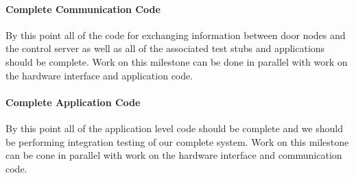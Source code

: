 \paragraph{Complete Communication Code}
By this point all of the code for exchanging information between door
nodes and the control server as well as all
of the associated test stubs and applications should be complete. Work on this
milestone can be done in parallel with work on the hardware interface and
application code.

\paragraph{Complete Application Code}
By this point all of the application level code should be complete and we should
be performing integration testing of our complete system. Work on this milestone
can be cone in parallel with work on the hardware interface and communication
code.
